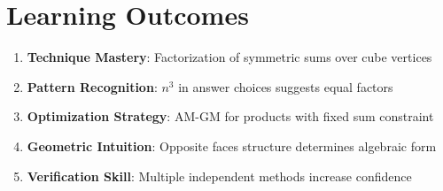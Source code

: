 \documentclass[]{article}
\begin{document}
\section*{Learning Outcomes}
\begin{enumerate}
    \item \textbf{Technique Mastery}: Factorization of symmetric sums over cube vertices
    \item \textbf{Pattern Recognition}: $n^3$ in answer choices suggests equal factors
    \item \textbf{Optimization Strategy}: AM-GM for products with fixed sum constraint
    \item \textbf{Geometric Intuition}: Opposite faces structure determines algebraic form
    \item \textbf{Verification Skill}: Multiple independent methods increase confidence
\end{enumerate}
\end{document}

